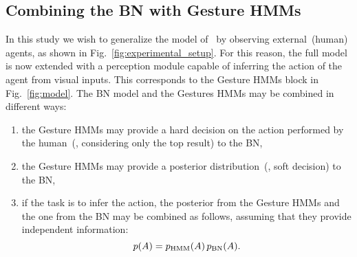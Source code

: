 \subsection{Combining the \acs{BN} with Gesture \acsp{HMM}}
\label{sec:combination}

In this study we wish to generalize the model of~\cite{salvi:2012:smcb} by observing external~(human) agents, as shown in Fig.~\ref{fig:experimental_setup}. For this reason, the full model is now extended with a perception module capable of inferring the action of the agent from visual inputs. This corresponds to the Gesture \acp{HMM} block in Fig.~\ref{fig:model}. The \AffWords{} \ac{BN} model and the Gestures \acp{HMM} may be combined in different ways:
\begin{enumerate}
\item the Gesture \acp{HMM} may provide a hard decision on the action performed by the human~(\ie, considering only the top result) to the \ac{BN},

\item the Gesture \acp{HMM} may provide a posterior distribution~(\ie, soft decision) to the \ac{BN},

\item if the task is to infer the action, the posterior from the Gesture \acp{HMM} and the one from the \ac{BN} may be combined as follows, assuming that they provide independent information:
\begin{equation*}
p(A) = p_{\text{HMM}}(A) \, p_{\text{BN}}(A).
\end{equation*}
\end{enumerate}

%

%
%
%

